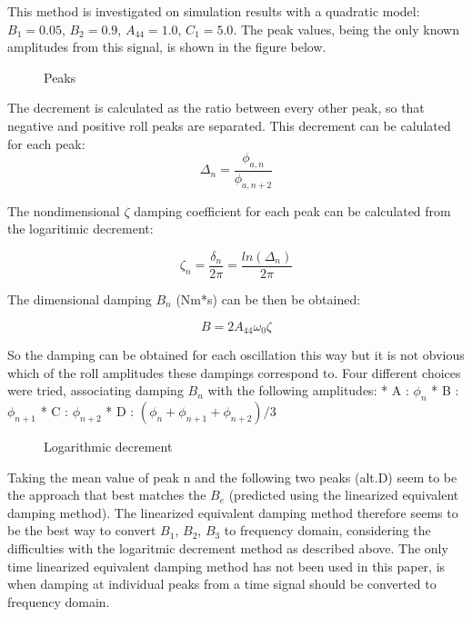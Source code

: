 This method is investigated on simulation results with a quadratic
model: \(B_1 = 0.05\), \(B_2 = 0.9\), \(A_{44} = 1.0\), \(C_1 = 5.0\).
The peak values, being the only known amplitudes from this signal, is
shown in the figure below.

    \begin{figure}
        \begin{center}\end{center}
        \caption{Peaks}
        \label{fig:peaks}
    \end{figure}
    
    The decrement is calculated as the ratio between every other peak, so
that negative and positive roll peaks are separated. This decrement can
be calulated for each peak:
\[ \Delta_n = \frac{\phi_{a,n}}{\phi_{a,n+2}}\]

    The nondimensional \(\zeta\) damping coefficient for each peak can be
calculated from the logaritimic decrement:

    \[\zeta_n = \frac{\delta_n}{2\pi}=\frac{ln(\Delta_n)}{2\pi}\]

    The dimensional damping \(B_n\) (Nm*s) can be then be obtained:
 
            
    
    \begin{equation}
B = 2 A_{44} \omega_{0} \zeta
\label{eq:equation}
\end{equation}

    

    So the damping can be obtained for each oscillation this way but it is
not obvious which of the roll amplitudes these dampings correspond to.
Four different choices were tried, associating damping \(B_n\) with the
following amplitudes: * A : \(\phi_n\) * B : \(\phi_{n+1}\) * C :
\(\phi_{n+2}\) * D : \((\phi_n + \phi_{n+1} + \phi_{n+2})/3\)

    \begin{figure}
        \begin{center}\end{center}
        \caption{Logarithmic decrement}
        \label{fig:logarithmic_decrement}
    \end{figure}
    
    Taking the mean value of peak n and the following two peaks (alt.D) seem
to be the approach that best matches the \(B_e\) (predicted using the
linearized equivalent damping method). The linearized equivalent damping
method therefore seems to be the best way to convert \(B_1\), \(B_2\),
\(B_3\) to frequency domain, considering the difficulties with the
logaritmic decrement method as described above. The only time linearized
equivalent damping method has not been used in this paper, is when
damping at individual peaks from a time signal should be converted to
frequency domain.

